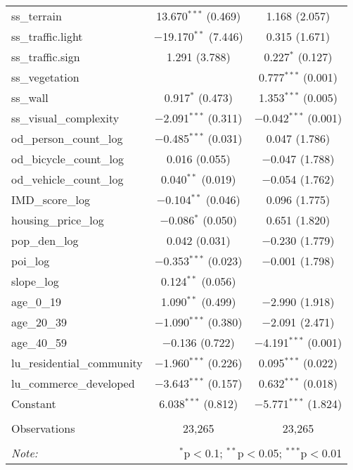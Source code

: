 \begin{table}[!htbp]
\begin{tabular}{@{\extracolsep{1pt}}lcc}
  ss\_terrain & 13.670$^{***}$ (0.469) & 1.168 (2.057) \\ 
  ss\_traffic.light & $-$19.170$^{**}$ (7.446) & 0.315 (1.671) \\ 
  ss\_traffic.sign & 1.291 (3.788) & 0.227$^{*}$ (0.127) \\ 
  ss\_vegetation &  & 0.777$^{***}$ (0.001) \\ 
  ss\_wall & 0.917$^{*}$ (0.473) & 1.353$^{***}$ (0.005) \\ 
  ss\_visual\_complexity & $-$2.091$^{***}$ (0.311) & $-$0.042$^{***}$ (0.001) \\ 
  od\_person\_count\_log & $-$0.485$^{***}$ (0.031) & 0.047 (1.786) \\ 
  od\_bicycle\_count\_log & 0.016 (0.055) & $-$0.047 (1.788) \\ 
  od\_vehicle\_count\_log & 0.040$^{**}$ (0.019) & $-$0.054 (1.762) \\ 
  IMD\_score\_log & $-$0.104$^{**}$ (0.046) & 0.096 (1.775) \\ 
  housing\_price\_log & $-$0.086$^{*}$ (0.050) & 0.651 (1.820) \\ 
  pop\_den\_log & 0.042 (0.031) & $-$0.230 (1.779) \\ 
  poi\_log & $-$0.353$^{***}$ (0.023) & $-$0.001 (1.798) \\ 
  slope\_log & 0.124$^{**}$ (0.056) &  \\ 
  age\_0\_19 & 1.090$^{**}$ (0.499) & $-$2.990 (1.918) \\ 
  age\_20\_39 & $-$1.090$^{***}$ (0.380) & $-$2.091 (2.471) \\ 
  age\_40\_59 & $-$0.136 (0.722) & $-$4.191$^{***}$ (0.001) \\ 
  lu\_residential\_community & $-$1.960$^{***}$ (0.226) & 0.095$^{***}$ (0.022) \\ 
  lu\_commerce\_developed & $-$3.643$^{***}$ (0.157) & 0.632$^{***}$ (0.018) \\ 
  Constant & 6.038$^{***}$ (0.812) & $-$5.771$^{***}$ (1.824) \\ 
 \hline \\[-1.8ex] 
Observations & 23,265 & 23,265 \\ 
\hline 
\hline \\[-1.8ex] 
\textit{Note:}  & \multicolumn{2}{r}{$^{*}$p$<$0.1; $^{**}$p$<$0.05; $^{***}$p$<$0.01} \\ 
\end{tabular} 
\end{table} 
